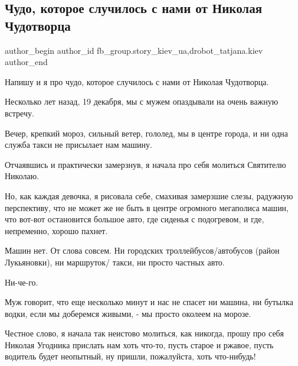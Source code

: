  
 
 
 
 
 
\subsection{Чудо, которое случилось с нами от Николая Чудотворца}
\label{sec:19_12_2021.fb.fb_group.story_kiev_ua.2.chudo_na_nikolaja}
 
\ifcmt
 author_begin
   author_id fb_group.story_kiev_ua,drobot_tatjana.kiev
 author_end
\fi

Напишу и я про чудо, которое случилось с нами от Николая Чудотворца. 

Несколько лет назад, 19 декабря, мы с мужем опаздывали на очень важную встречу. 


Вечер, крепкий мороз, сильный ветер, гололед, мы в центре города, и ни одна
служба такси не присылает нам машину. 

Отчаявшись и практически замерзнув, я начала про себя молиться Святителю
Николаю. 

Но, как каждая девочка, я рисовала себе, смахивая замерзшие слезы, радужную
перспективу, что не может же не быть в центре огромного мегаполиса машин, что
вот-вот остановится большое авто, где сиденья с подогревом, и где, непременно,
хорошо пахнет.

Машин нет. От слова совсем. Ни городских троллейбусов/автобусов (район
Лукьяновки), ни маршруток/ такси, ни просто частных авто.

Ни-че-го.

Муж говорит, что еще несколько минут и нас не спасет ни машина, ни бутылка
водки, если мы доберемся живыми, -  мы просто околеем на морозе. 

Честное слово, я начала так неистово молиться, как никогда, прошу про себя
Николая Угодника прислать нам хоть что-то, пусть старое и ржавое, пусть
водитель будет неопытный, ну пришли, пожалуйста, хоть что-нибудь!

